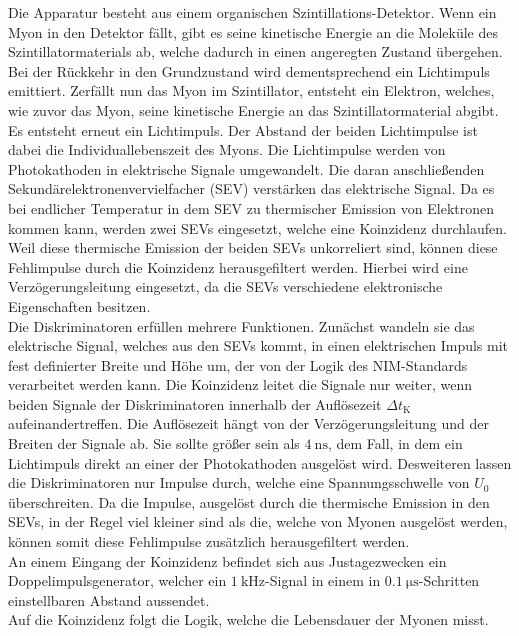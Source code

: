 Die Apparatur besteht aus einem organischen Szintillations-Detektor.
Wenn ein Myon in den Detektor fällt, gibt es seine kinetische Energie an die Moleküle des Szintillatormaterials ab, welche dadurch in einen angeregten Zustand übergehen.
Bei der Rückkehr in den Grundzustand wird dementsprechend ein Lichtimpuls emittiert.
Zerfällt nun das Myon im Szintillator, entsteht ein Elektron, welches, wie zuvor das Myon, seine kinetische Energie an das Szintillatormaterial abgibt.
Es entsteht erneut ein Lichtimpuls.
Der Abstand der beiden Lichtimpulse ist dabei die Individuallebenszeit des Myons.
Die Lichtimpulse werden von Photokathoden in elektrische Signale umgewandelt.
Die daran anschließenden Sekundärelektronenvervielfacher (SEV) verstärken das elektrische Signal.
Da es bei endlicher Temperatur in dem SEV zu thermischer Emission von Elektronen kommen kann, werden zwei SEVs eingesetzt, welche eine Koinzidenz durchlaufen.
Weil diese thermische Emission der beiden SEVs unkorreliert sind, können diese Fehlimpulse durch die Koinzidenz herausgefiltert werden.
Hierbei wird eine Verzögerungsleitung eingesetzt, da die SEVs verschiedene elektronische Eigenschaften besitzen.\\
Die Diskriminatoren erfüllen mehrere Funktionen.
Zunächst wandeln sie das elektrische Signal, welches aus den SEVs kommt, in einen elektrischen Impuls mit fest definierter Breite und Höhe um, der von der Logik des NIM-Standards verarbeitet werden kann.
Die Koinzidenz leitet die Signale nur weiter, wenn beiden Signale der Diskriminatoren innerhalb der Auflösezeit $\Delta t_\text{K}$ aufeinandertreffen.
Die Auflösezeit hängt von der Verzögerungsleitung und der Breiten der Signale ab.
Sie sollte größer sein als $\SI{4}{\nano\second}$, dem Fall, in dem ein Lichtimpuls direkt an einer der Photokathoden ausgelöst wird.
Desweiteren lassen die Diskriminatoren nur Impulse durch, welche eine Spannungsschwelle von $U_0$ überschreiten.
Da die Impulse, ausgelöst durch die thermische Emission in den SEVs, in der Regel viel kleiner sind als die, welche von Myonen ausgelöst werden, können somit diese Fehlimpulse zusätzlich herausgefiltert werden.\\
An einem Eingang der Koinzidenz befindet sich aus Justagezwecken ein Doppelimpulsgenerator, welcher ein $\SI{1}{\kilo\hertz}$-Signal in einem in $\SI{0,1}{\micro\second}$-Schritten einstellbaren Abstand aussendet.\\
Auf die Koinzidenz folgt die Logik, welche die Lebensdauer der Myonen misst.
